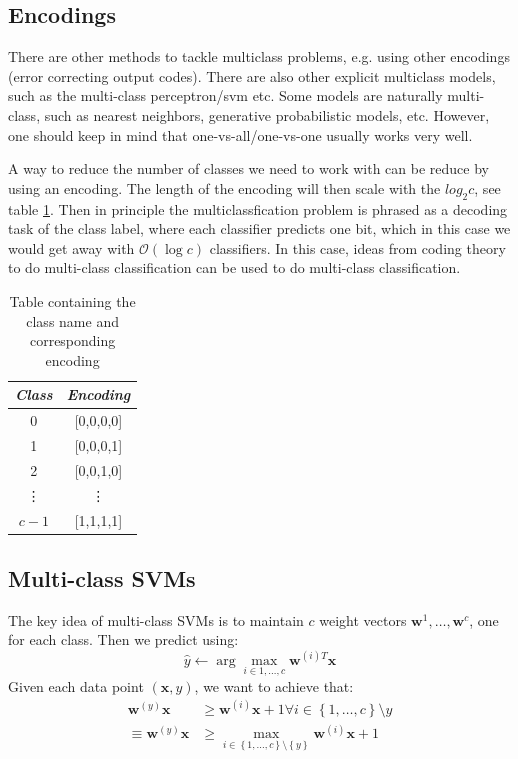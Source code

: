 \documentclass[a4paper,10pt,twoside]{article}
\begin{document}
\subsection{Encodings}

There are other methods to tackle multiclass problems, e.g. using other encodings (error correcting output codes). There are also other explicit multiclass models, such as the multi-class perceptron/svm etc. Some models are naturally multi-class, such as nearest neighbors, generative probabilistic models, etc. However, one should keep in mind that one-vs-all/one-vs-one usually works very well.

A way to reduce the number of classes we need to work with can be reduce by using an encoding. The length of the encoding will then scale with the $log_{2}c$, see table \ref{binary-label-encoding}. Then in principle the multiclassfication problem is phrased as a decoding task of the class label, where each classifier predicts one bit, which in this case we would get away with $\mathcal{O}(\log c)$ classifiers. In this case, ideas from coding theory to do multi-class classification can be used to do multi-class classification.

\begin{table}
    \centering
    \begin{tabular}{cc}
        \toprule
        \textit{Class} & \textit{Encoding} \\
        \midrule
        0 & [0,0,0,0]\\
        1 & [0,0,0,1]\\
        2 & [0,0,1,0]\\
        \vdots & \vdots\\
        $c-1$ & [1,1,1,1]\\
        \bottomrule
    \end{tabular}
    \caption{Table containing the class name and corresponding encoding}
    \label{binary-label-encoding}
\end{table}

\subsection{Multi-class SVMs}

The key idea of multi-class SVMs is to maintain $c$ weight vectors $\mathbf{w}^{1},\ldots,\mathbf{w}^{c}$, one for each class. Then we predict using:
\begin{equation*}
    \hat{y} \leftarrow \arg\max_{i\in{1,\ldots,c}}\mathbf{w}^{(i)T}\mathbf{x}
\end{equation*}
Given each data point $(\mathbf{x},y)$, we want to achieve that:
\begin{align}\label{multiclasssvm}
    \mathbf{w}^{(y)}\mathbf{x}&\geq\mathbf{w}^{(i)}\mathbf{x}+1 \forall i\in\left\{1,\ldots, c\right\}\setminus{y}\\
    \equiv \mathbf{w}^{(y)}\mathbf{x}&\geq\max_{i\in\left\{1,\ldots,c\right\}\setminus\left\{y\right\}}\mathbf{w}^{(i)}\mathbf{x}+1
\end{align}
\end{document}
